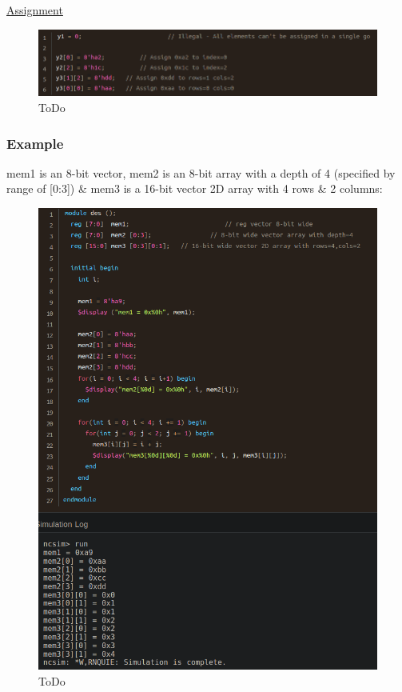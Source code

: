 \documentclass{article}
\begin{document}
	\underline{Assignment}

	\begin{figure}[H]
		\includegraphics[width=\linewidth]{VerilogPics/figure_20.png}
		\caption{ToDo}
		\label{ToDo}
	\end{figure}

	\subsubsection{Example}

	mem1 is an 8-bit vector, mem2 is an 8-bit array with a depth of 4 (specified by range of [0:3]) \& mem3 is a 16-bit vector 2D array with 4 rows \& 2 columns:

	\begin{figure}[H]
		\includegraphics[width=\linewidth]{VerilogPics/figure_21.png}
		\caption{ToDo}
		\label{ToDo}
	\end{figure}
\end{document}
